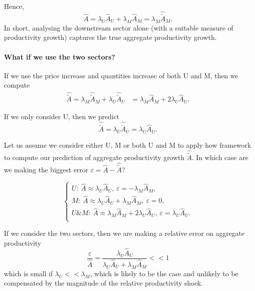 \documentclass[11pt]{article}
\begin{document}
Hence,
\begin{equation}
      \hat{A}  =  \lambda_U \hat{A}_U+\lambda_M \hat{A}_M 
     =  \lambda_M \hat{\tilde{A}}_M.
\end{equation}
In short, analysing the downstream sector alone (with a suitable measure of productivity growth) captures the true aggregate productivity growth.

\paragraph{What if we use the two sectors?}
If we use the price increase and quantities increase of both U and M, then we compute
\begin{align*}
 \hat{\tilde{A}}=\lambda_M  \hat{\tilde{A}}_M +  \lambda_U  \hat{\tilde{A}}_U 
    &=
    \lambda_M  \hat{A}_M +  2\lambda_U  \hat{A}_U.
\end{align*}

If we only consider U, then we predict
\begin{equation*}
 \hat{\tilde{A}}=  \lambda_U  \hat{\tilde{A}}_U= \lambda_U  \hat{A}_U.
\end{equation*}

Let us assume we consider either U, M or both U and M to apply how framework to compute our prediction of aggregate productivity growth $\hat{\tilde{A}}$. In which case are we making the biggest error $\varepsilon=\hat{A}-\hat{\tilde{A}}$?

\begin{equation}
\begin{cases}
    U:~ \hat{A} \approx  \lambda_U  \hat{A}_U, ~\varepsilon= -\lambda_M  \hat{A}_M,\\
      M:~ \hat{A} \approx  \lambda_U \hat{A}_U+\lambda_M \hat{A}_M , ~\varepsilon= 0,\\
        U\&M:~ \hat{A} \approx  \lambda_M  \hat{A}_M +  2\lambda_U  \hat{A}_U , ~\varepsilon= \lambda_U  \hat{A}_U.\\
\end{cases}
\end{equation}

If we consider the two sectors, then we are making a relative error on aggregate productivity 
\begin{equation*}
   \frac{\varepsilon}{\hat{A}}= \frac{\lambda_U  \hat{A}_U}{ \lambda_U \hat{A}_U+\lambda_M \hat{A}_M}<<1
\end{equation*}
which is small if $\lambda_U<<\lambda_M$, which is likely to be the case and unlikely to be compensated by the magnitude of the relative productivity shock. 
\end{document}
